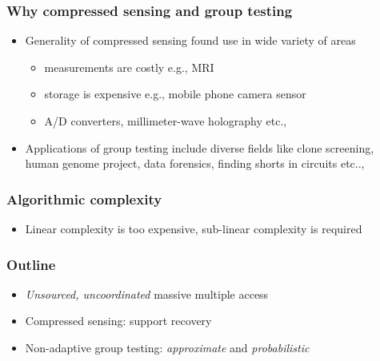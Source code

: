 \documentclass[10pt,usenames,dvipsnames]{beamer}
\def\figpath{../Figures}
\begin{document}
\begin{frame}
\frametitle{Why compressed sensing and group testing}
\begin{itemize}
\setlength\itemsep{6pt}

	\item Generality of compressed sensing found use in wide variety of areas
	\begin{itemize}
	\setlength\itemsep{3pt}
 		\item measurements are costly e.g., MRI
		\item storage is expensive e.g., mobile phone camera sensor
		\item A/D converters, millimeter-wave holography etc.,
	\end{itemize}
	\item Applications of group testing include diverse fields like clone screening, human genome project, data forensics, finding shorts in circuits etc..,
\end{itemize}
\end{frame}

\begin{frame}\frametitle{Algorithmic complexity}
\centering
\resizebox{0.6\textwidth}{!}{}

\begin{itemize}
\item<2> Linear complexity is too expensive, sub-linear complexity is required
\end{itemize}
\end{frame}


\begin{frame}
\frametitle{Outline}
\begin{itemize}
\setlength{\itemsep}{6pt}
\item \emph{Unsourced, uncoordinated} massive multiple access
\item Compressed sensing: support recovery
\item Non-adaptive group testing: \emph{approximate} and \emph{probabilistic}
\end{itemize}
\centering
\resizebox{0.5\textwidth}{!}{}
\end{frame}
\end{document}
